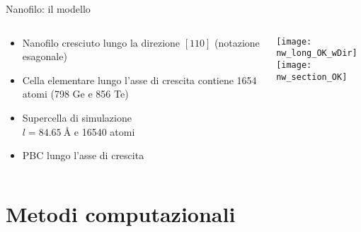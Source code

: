 \documentclass{beamer}
\begin{document}
\begin{frame}{Nanofilo: il modello}
 \begin{columns}
  \begin{column}{0.5\textwidth}
    \begin{itemize}
      \item Nanofilo cresciuto lungo la {\ev direzione $[110]$} (notazione esagonale)
      \item Cella elementare lungo l'asse di crescita contiene \num{1654} atomi (\num{798} Ge e \num{856} Te)
      \item Supercella di simulazione \\ {\ev$l=\SI{84.65}{\angstrom}$} e {\ev\num{16540} atomi}
      \item PBC lungo l'asse di crescita
  \end{itemize}
  \end{column}
  \begin{column}{0.5\textwidth}
   \centering
   \texttt{[image: nw\_long\_OK\_wDir]}\\[6pt]
   \texttt{[image: nw\_section\_OK]}
  \end{column}
 \end{columns}
\end{frame}





\section{Metodi computazionali}



\end{document}
